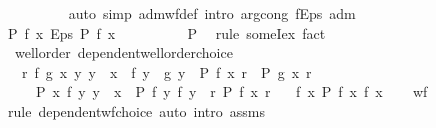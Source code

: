 \begin{isabellebody}
\ \ \ \ \ \ \ \ \isamarkupfalse%
\ {\isacharparenleft}{\kern0pt}auto\ simp{\isacharcolon}{\kern0pt}\ adm{\isacharunderscore}{\kern0pt}wf{\isacharunderscore}{\kern0pt}def\ intro{\isacharbang}{\kern0pt}{\isacharcolon}{\kern0pt}\ arg{\isacharunderscore}{\kern0pt}cong{\isacharbrackleft}{\kern0pt}\ f{\isacharequal}{\kern0pt}Eps{\isacharbrackright}{\kern0pt}\ adm{\isacharparenright}{\kern0pt}\isanewline
\ \ \ \ \ \ \isamarkupfalse%
\ {\isachardoublequoteopen}P\ f\ x\ {\isacharparenleft}{\kern0pt}Eps\ {\isacharparenleft}{\kern0pt}P\ f\ x{\isacharparenright}{\kern0pt}{\isacharparenright}{\kern0pt}{\isachardoublequoteclose}\isanewline
\ \ \ \ \ \ \ \ \isamarkupfalse%
\ P\ \isamarkupfalse%
\ {\isacharparenleft}{\kern0pt}rule\ someI{\isacharunderscore}{\kern0pt}ex{\isacharparenright}{\kern0pt}\ fact\isanewline
\ \ \ \ \isamarkupfalse%
\isanewline
\ \ \isamarkupfalse%
\isanewline
{}\isamarkupfalse%
%
\endisatagproof
{\isafoldproof}%
%
\isadelimproof
\isanewline
%
\endisadelimproof
\isanewline
{}\isamarkupfalse%
\ {\isacharparenleft}{\kern0pt}\ wellorder{\isacharparenright}{\kern0pt}\ dependent{\isacharunderscore}{\kern0pt}wellorder{\isacharunderscore}{\kern0pt}choice{\isacharcolon}{\kern0pt}\isanewline
\ \ \ {\isachardoublequoteopen}{\isasymAnd}r\ f\ g\ x{\isachardot}{\kern0pt}\ {\isacharparenleft}{\kern0pt}{\isasymAnd}y{\isachardot}{\kern0pt}\ y\ {\isacharless}{\kern0pt}\ x\ {\isasymLongrightarrow}\ f\ y\ {\isacharequal}{\kern0pt}\ g\ y{\isacharparenright}{\kern0pt}\ {\isasymLongrightarrow}\ P\ f\ x\ r\ {\isacharequal}{\kern0pt}\ P\ g\ x\ r{\isachardoublequoteclose}\isanewline
\ \ \ \ \ P{\isacharcolon}{\kern0pt}\ {\isachardoublequoteopen}{\isasymAnd}x\ f{\isachardot}{\kern0pt}\ {\isacharparenleft}{\kern0pt}{\isasymAnd}y{\isachardot}{\kern0pt}\ y\ {\isacharless}{\kern0pt}\ x\ {\isasymLongrightarrow}\ P\ f\ y\ {\isacharparenleft}{\kern0pt}f\ y{\isacharparenright}{\kern0pt}{\isacharparenright}{\kern0pt}\ {\isasymLongrightarrow}\ {\isasymexists}r{\isachardot}{\kern0pt}\ P\ f\ x\ r{\isachardoublequoteclose}\isanewline
\ \ \ {\isachardoublequoteopen}{\isasymexists}f{\isachardot}{\kern0pt}\ {\isasymforall}x{\isachardot}{\kern0pt}\ P\ f\ x\ {\isacharparenleft}{\kern0pt}f\ x{\isacharparenright}{\kern0pt}{\isachardoublequoteclose}\isanewline
%
\isadelimproof
\ \ %
\endisadelimproof
%
\isatagproof
{}\isamarkupfalse%
\ wf\ \isamarkupfalse%
\ {\isacharparenleft}{\kern0pt}rule\ dependent{\isacharunderscore}{\kern0pt}wf{\isacharunderscore}{\kern0pt}choice{\isacharparenright}{\kern0pt}\ {\isacharparenleft}{\kern0pt}auto\ intro{\isacharbang}{\kern0pt}{\isacharcolon}{\kern0pt}\ assms{\isacharparenright}{\kern0pt}%
\endisatagproof
{\isafoldproof}%
%
\isadelimproof
\isanewline
%
\endisadelimproof
%
\isadelimtheory
\isanewline
%
\endisadelimtheory
%
\isatagtheory
{}\isamarkupfalse%
%
\endisatagtheory
{\isafoldtheory}%
%
\isadelimtheory
%
\endisadelimtheory
%
\end{isabellebody}%
